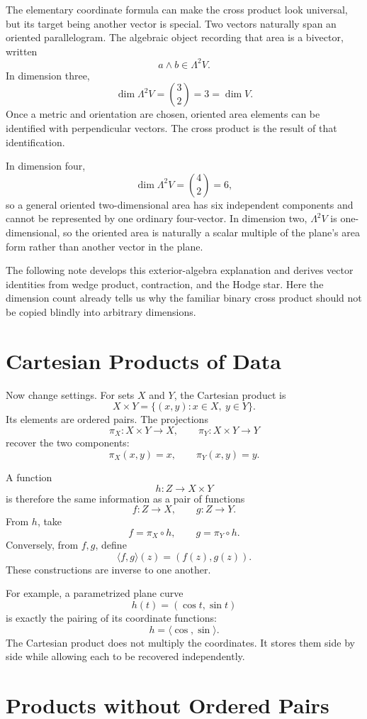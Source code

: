 The elementary coordinate formula can make the cross product look universal, but its target being another vector is special.  Two vectors naturally span an oriented parallelogram.  The algebraic object recording that area is a bivector, written
\[
  a\wedge b\in\Lambda^2V.
\]
In dimension three,
\[
  \dim\Lambda^2V=\binom32=3=\dim V.
\]
Once a metric and orientation are chosen, oriented area elements can be identified with perpendicular vectors.  The cross product is the result of that identification.

In dimension four,
\[
  \dim\Lambda^2V=\binom42=6,
\]
so a general oriented two-dimensional area has six independent components and cannot be represented by one ordinary four-vector.  In dimension two, \(\Lambda^2V\) is one-dimensional, so the oriented area is naturally a scalar multiple of the plane's area form rather than another vector in the plane.

The following note develops this exterior-algebra explanation and derives vector identities from wedge product, contraction, and the Hodge star.  Here the dimension count already tells us why the familiar binary cross product should not be copied blindly into arbitrary dimensions.

\section{Cartesian Products of Data}

Now change settings.  For sets \(X\) and \(Y\), the Cartesian product is
\[
  X\times Y=\{(x,y):x\in X,\ y\in Y\}.
\]
Its elements are ordered pairs.  The projections
\[
  \pi_X:X\times Y\to X,
  \qquad
  \pi_Y:X\times Y\to Y
\]
recover the two components:
\[
  \pi_X(x,y)=x,
  \qquad
  \pi_Y(x,y)=y.
\]

A function
\[
  h:Z\to X\times Y
\]
is therefore the same information as a pair of functions
\[
  f:Z\to X,
  \qquad
  g:Z\to Y.
\]
From \(h\), take
\[
  f=\pi_X\circ h,
  \qquad
  g=\pi_Y\circ h.
\]
Conversely, from \(f,g\), define
\[
  \langle f,g\rangle(z)=(f(z),g(z)).
\]
These constructions are inverse to one another.

For example, a parametrized plane curve
\[
  h(t)=(\cos t,\sin t)
\]
is exactly the pairing of its coordinate functions:
\[
  h=\langle\cos,\sin\rangle.
\]
The Cartesian product does not multiply the coordinates.  It stores them side by side while allowing each to be recovered independently.

\section{Products without Ordered Pairs}


